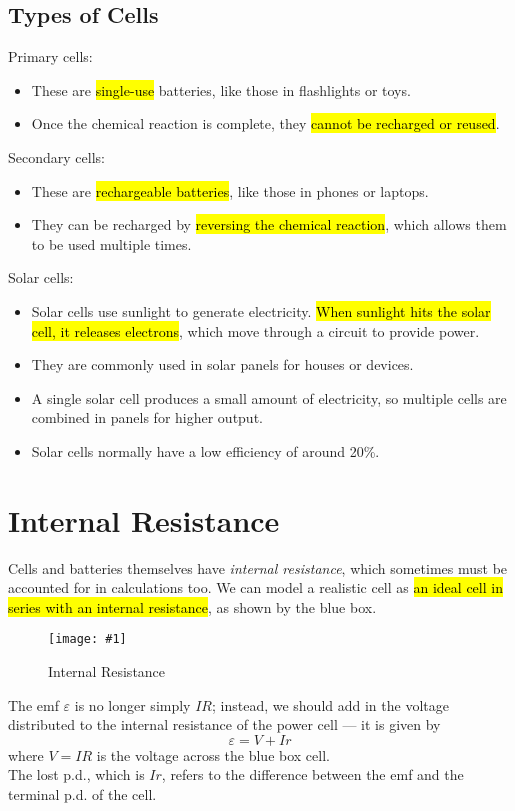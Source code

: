 \documentclass[a4paper,12pt]{article}
\let\oldsection\section
\renewcommand\section{\clearpage\oldsection}
\newcommand{\lb}{\\[8pt]}
\newcommand{\img}[4]{\begin{center}
  \begin{figure}[H]
    \centering
    \texttt{[image: \#1]}
    \caption{#3}
    \label{fig:#4}
  \end{figure}
\end{center}}
\begin{document}
\subsection{Types of Cells}
Primary cells:
\begin{itemize}
  \item These are \hl{single-use} batteries, like those in flashlights or toys.
  \item Once the chemical reaction is complete, they \hl{cannot be recharged or reused}.
\end{itemize}
Secondary cells:
\begin{itemize}
  \item These are \hl{rechargeable batteries}, like those in phones or laptops.
  \item They can be recharged by \hl{reversing the chemical reaction}, which allows them to be used multiple times.
\end{itemize}

\pagebreak
Solar cells:
\begin{itemize}
  \item Solar cells use sunlight to generate electricity. \hl{When sunlight hits the solar cell, it releases electrons}, which move through a circuit to provide power.
  \item They are commonly used in solar panels for houses or devices.
  \item A single solar cell produces a small amount of electricity, so multiple cells are combined in panels for higher output.
  \item Solar cells normally have a low efficiency of around 20\%.
\end{itemize}

\section{Internal Resistance}

Cells and batteries themselves have \textit{internal resistance}, which sometimes must be accounted for in calculations too. We can model a realistic cell as \hl{an ideal cell in series with an internal resistance}, as shown by the blue box.

\img{internalresistance.png}{0.7}{Internal Resistance}{internalresistance}

The emf $\varepsilon$ is no longer simply $IR$; instead, we should add in the voltage distributed to the internal resistance of the power cell --- it is given by $$\varepsilon = V + Ir$$where $V = IR$ is the voltage across the blue box cell.\lb
The lost p.d., which is $Ir$, refers to the difference between the emf and the terminal p.d. of the cell.
\end{document}
